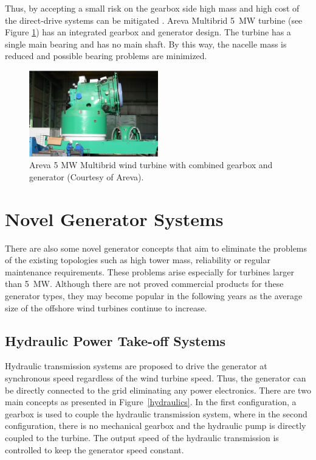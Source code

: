 \documentclass[a4paper, 11pt]{article} %
\begin{document}
Thus, by accepting a small risk on the gearbox side high mass and high cost of the direct-drive systems can be mitigated \cite{Bohmeke2003}. Areva Multibrid 5~MW  turbine (see Figure \ref{multibrid}) has an integrated gearbox and generator design. The turbine has a single main bearing and has no main shaft. By this way, the nacelle mass is reduced and possible bearing problems are minimized. 

  \begin{figure}
    \centering
    \includegraphics[width=0.5\textwidth]{multibrid}
    \caption{Areva 5 MW Multibrid wind turbine with combined gearbox and generator (Courtesy of Areva).} 
    \label{multibrid}
  \end{figure}

\section{Novel Generator Systems}

There are also some novel generator concepts that aim to eliminate the problems of the existing topologies such as high tower mass, reliability or regular maintenance requirements. These problems arise especially for turbines larger than 5~MW. Although there are not proved commercial products for these generator types, they may become popular in the following years as the average size of the offshore wind turbines continue to increase.

\subsection{Hydraulic Power Take-off Systems}

Hydraulic transmission systems are proposed to drive the generator at synchronous speed regardless of the wind turbine speed. Thus, the generator can be directly connected to the grid eliminating any power electronics. There are two main concepts as presented in Figure~\ref{hydraulics}. In the first configuration, a gearbox is used to couple the hydraulic transmission system, where in the second configuration, there is no mechanical gearbox and the hydraulic pump is directly coupled to the turbine. The output speed of the hydraulic transmission is controlled to keep the generator speed constant.
\end{document}
